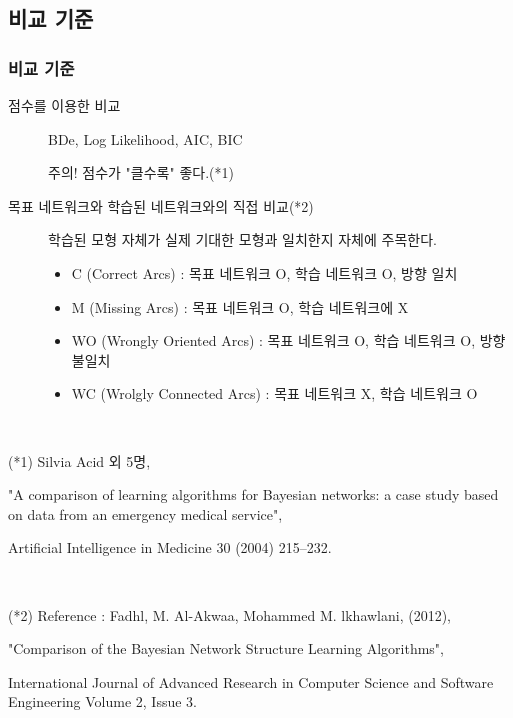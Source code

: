 \documentclass{beamer}
\begin{document}
\subsection{비교 기준}
\begin{frame}
\frametitle{비교 기준}
{\scriptsize{}
	\begin{description}
	
	\item[점수를 이용한 비교] BDe, Log Likelihood, AIC, BIC
	
	주의! 점수가 "클수록" 좋다.(*1)

	\item[목표 네트워크와 학습된 네트워크와의 직접 비교(*2)]
	
		학습된 모형 자체가 실제 기대한 모형과 일치한지 자체에 주목한다.

		\begin{itemize}
			\item C (Correct Arcs) : 목표 네트워크 O, 학습 네트워크 O, 방향 일치
			\item M (Missing Arcs) : 목표 네트워크 O, 학습 네트워크에 X
			\item WO (Wrongly Oriented Arcs) : 목표 네트워크 O, 학습 네트워크 O, 방향 불일치
			\item WC (Wrolgly Connected Arcs) : 목표 네트워크 X, 학습 네트워크 O
		\end{itemize}
	\end{description}
}

{}\

\tiny{(*1) Silvia Acid 외 5명,

"A comparison of learning algorithms for Bayesian networks: a case study based on data from an emergency medical service",

Artificial Intelligence in Medicine 30 (2004) 215–232.}

{}\

\tiny{(*2) Reference : Fadhl, M. Al-Akwaa, Mohammed M. lkhawlani, (2012),

"Comparison of the Bayesian Network Structure Learning Algorithms",

International Journal of Advanced Research in Computer Science and Software Engineering Volume 2, Issue 3.}

\end{frame}
\end{document}
